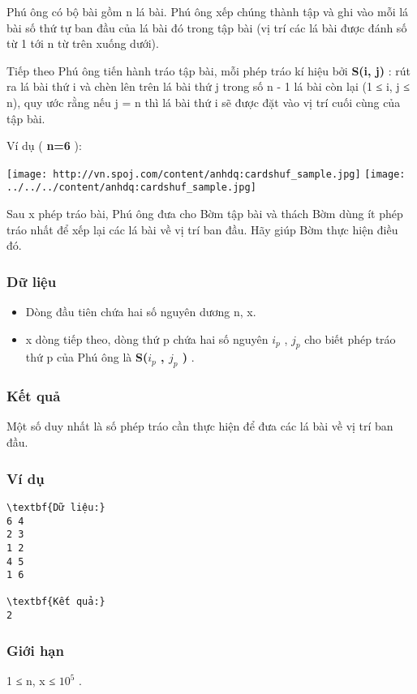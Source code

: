 

Phú ông có bộ bài gồm n lá bài. Phú ông xếp chúng thành tập và ghi vào mỗi lá bài số thứ tự ban đầu của lá bài đó trong tập bài (vị trí các lá bài được đánh số từ 1 tới n từ trên xuống dưới).


Tiếp theo Phú ông tiến hành tráo tập bài, mỗi phép tráo kí hiệu bởi \textbf{ S(i, j) } : rút ra lá bài thứ i và chèn lên trên lá bài thứ j trong số n - 1 lá bài còn lại (1 ≤ i, j ≤ n), quy ước rằng nếu j = n thì lá bài thứ i sẽ được đặt vào vị trí cuối cùng của tập bài.


Ví dụ ( \textbf{ n=6 } ):


\texttt{[image: http://vn.spoj.com/content/anhdq:cardshuf\_sample.jpg]}
\texttt{[image: ../../../content/anhdq:cardshuf\_sample.jpg]}




Sau x phép tráo bài, Phú ông đưa cho Bờm tập bài và thách Bờm dùng ít phép tráo nhất để xếp lại các lá bài về vị trí ban đầu. Hãy giúp Bờm thực hiện điều đó.

\subsubsection{Dữ liệu}
\begin{itemize}
	\item Dòng đầu tiên chứa hai số nguyên dương n, x.
	\item x dòng tiếp theo, dòng thứ p chứa hai số nguyên $i_{p}$ , $j_{p}$ cho biết phép tráo thứ p của Phú ông là \textbf{ S($i_{p}$ , $j_{p}$ ) } .
\end{itemize}

\subsubsection{Kết quả}

Một số duy nhất là số phép tráo cần thực hiện để đưa các lá bài về vị trí ban đầu.

\subsubsection{Ví dụ}
\begin{verbatim}
\textbf{Dữ liệu:}
6 4
2 3
1 2
4 5
1 6

\textbf{Kết quả:}
2
\end{verbatim}

\subsubsection{Giới hạn}

1 ≤ n, x ≤ $10^{5}$ .
